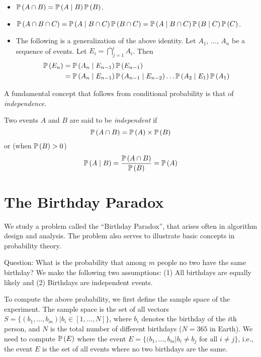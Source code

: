 \begin{theorem}\label{thm:chainrule}
    \begin{itemize}
        \item $\operatorname{\mathbb{P}}\left(A\cap B\right)=\operatorname{\mathbb{P}}\left(A \mid B\right) \operatorname{\mathbb{P}}\left(B\right)$.
        \item $\operatorname{\mathbb{P}}\left(A\cap B\cap C\right)=\operatorname{\mathbb{P}}\left(A \mid B\cap C\right)\operatorname{\mathbb{P}}\left(B\cap C\right) = \operatorname{\mathbb{P}}\left(A \mid B\cap C\right) \operatorname{\mathbb{P}}\left(B \mid C\right)\operatorname{\mathbb{P}}\left(C\right)$.
        \item The following is a generalization of the above identity.
              Let $A_1$, $\dots$, $A_n$ be a sequence of events.
              Let $E_i = \bigcap_{j=1}^i A_i$. Then
              \begin{align*}\operatorname{\mathbb{P}}\left(E_n\right)
                   & =\operatorname{\mathbb{P}}\left(A_n \mid E_{n-1}\right)\operatorname{\mathbb{P}}\left(E_{n-1}\right)                                                      \\
                   & = \operatorname{\mathbb{P}}\left(A_n \mid E_{n-1}\right)\operatorname{\mathbb{P}}\left(A_{n-1} \mid E_{n-2}\right)\dots \operatorname{\mathbb{P}}\left(A_2 \mid E_1\right)\operatorname{\mathbb{P}}\left(A_1\right)
              \end{align*}
    \end{itemize}
\end{theorem}

A fundamental concept that follows from conditional probability is that of \emph{independence}.

\begin{definition}
    Two events $A$ and $B$ are  said to be \emph{independent} if
    \[\operatorname{\mathbb{P}}\left(A\cap B\right) = \operatorname{\mathbb{P}}\left(A\right) \times \operatorname{\mathbb{P}}\left(B\right)\]
    or (when $\operatorname{\mathbb{P}}\left(B\right) > 0$)
    \[\operatorname{\mathbb{P}}\left(A \mid B\right) = \frac{\operatorname{\mathbb{P}}\left(A\cap B\right)}{\operatorname{\mathbb{P}}\left(B\right)} = \operatorname{\mathbb{P}}\left(A\right)\]
\end{definition}


\section{The Birthday Paradox}

We study a problem called the ``Birthday Paradox'', that arises often in algorithm design and analysis.
The problem also serves to illustrate basic concepts in probability theory.

Question: What is the probability that among $m$ people no two have the same birthday?
We make the  following two assumptions: (1) All birthdays are equally likely and (2) Birthdays are independent events.

To compute the above probability, we first define the sample space of the experiment.
The sample space is the set of all vectors $S = \{(b_1, \dots, b_m) | b_i \in [1,
        \dots, N]\}$, where $b_i$ denotes the birthday of the $i\text{th}$ person, and $N$ is the total number of different birthdays ($N= 365$ in Earth).
We need to compute $\operatorname{\mathbb{P}}\left(E\right)$ where the event $E = \{(b_1,\dots, b_m | b_i \neq b_j \mbox{ for all }
    i \neq j\}$, i.e., the event $E$ is the set of all events where no two birthdays are the same.

